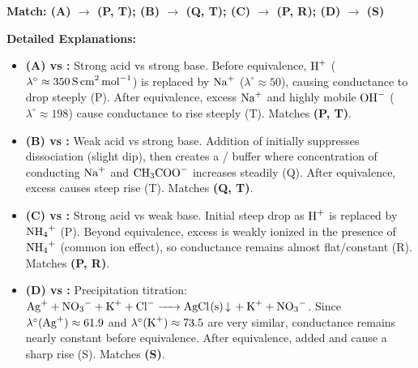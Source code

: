 \begin{solution}
\textbf{Match: (A) $\to$ (P, T); (B) $\to$ (Q, T); (C) $\to$ (P, R); (D) $\to$ (S)}

\textbf{Detailed Explanations:}
\begin{itemize}
    \item \textbf{(A)  vs :} Strong acid vs strong base. Before equivalence, $\ce{H+}$ ($\lambda^\circ \approx 350\,\text{S\,cm}^2\,\text{mol}^{-1}$) is replaced by $\ce{Na+}$ ($\lambda^\circ \approx 50$), causing conductance to drop steeply (P). After equivalence, excess $\ce{Na+}$ and highly mobile $\ce{OH-}$ ($\lambda^\circ \approx 198$) cause conductance to rise steeply (T). Matches \textbf{(P, T)}.
    \item \textbf{(B)  vs :} Weak acid vs strong base. Addition of  initially suppresses  dissociation (slight dip), then creates a / buffer where concentration of conducting $\ce{Na+}$ and $\ce{CH3COO-}$ increases steadily (Q). After equivalence, excess  causes steep rise (T). Matches \textbf{(Q, T)}.
    \item \textbf{(C)  vs :} Strong acid vs weak base. Initial steep drop as $\ce{H+}$ is replaced by $\ce{NH4+}$ (P). Beyond equivalence, excess  is weakly ionized in the presence of $\ce{NH4+}$ (common ion effect), so conductance remains almost flat/constant (R). Matches \textbf{(P, R)}.
    \item \textbf{(D)  vs :} Precipitation titration: $\ce{Ag+ + NO3- + K+ + Cl- -> AgCl(s) v + K+ + NO3-}$. Since $\lambda^\circ(\ce{Ag+}) \approx 61.9$ and $\lambda^\circ(\ce{K+}) \approx 73.5$ are very similar, conductance remains nearly constant before equivalence. After equivalence, added  and  cause a sharp rise (S). Matches \textbf{(S)}.
\end{itemize}
\end{solution}

